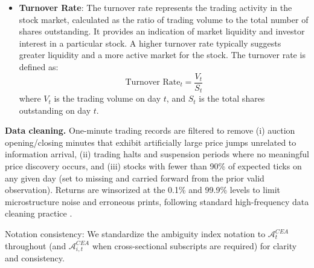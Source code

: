 \documentclass[preprint,12pt,authoryear]{elsarticle}
\renewcommand{\textcolor}[2]{\begingroup\color{#1}#2\endgroup}
\begin{document}
\begin{itemize}
    \item \textbf{Turnover Rate}: The turnover rate represents the trading activity in the stock market, calculated as the ratio of trading volume to the total number of shares outstanding. It provides an indication of market liquidity and investor interest in a particular stock. A higher turnover rate typically suggests greater liquidity and a more active market for the stock. The turnover rate is defined as:
    \[
    \text{Turnover Rate}_t = \frac{V_t}{S_t}
    \]
    where $V_t$ is the trading volume on day $t$, and $S_t$ is the total shares outstanding on day $t$.
\end{itemize}

\par
\textcolor{red}{\textbf{Data cleaning.} One-minute trading records are filtered to remove (i) auction opening/closing minutes that exhibit artificially large price jumps unrelated to information arrival, (ii) trading halts and suspension periods where no meaningful price discovery occurs, and (iii) stocks with fewer than 90\% of expected ticks on any given day (set to missing and carried forward from the prior valid observation). Returns are winsorized at the 0.1\% and 99.9\% levels to limit microstructure noise and erroneous prints, following standard high-frequency data cleaning practice \citep[][Section 2]{fan2019measurement}.}

\textcolor{red}{Notation consistency: We standardize the ambiguity index notation to $\mathcal{A}^{CEA}_t$ throughout (and $\mathcal{A}^{CEA}_{i,t}$ when cross-sectional subscripts are required) for clarity and consistency.}

\begin{table}[h]
  \centering
  \caption{Descriptive Statistics}
  \label{tab:descriptive_stats_transposed}
\end{table}
\end{document}
